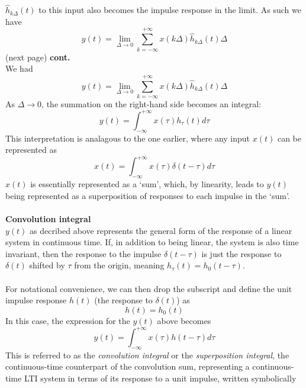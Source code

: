 \documentclass{report}
\begin{document}
$\hat{h}_{k\Delta}(t)$ to this input also becomes the impulse response in the limit. As such we have
\begin{equation*}
y(t)=\lim_{\Delta\to0}\sum^{+\infty}_{k=-\infty}x(k\Delta)
\hat{h}_{k\Delta}(t)\Delta
\end{equation*}
(next page)\newpage
\noindent\textbf{cont.}\\
We had
\begin{equation*}
y(t)=\lim_{\Delta\to0}\sum^{+\infty}_{k=-\infty}x(k\Delta)
\hat{h}_{k\Delta}(t)\Delta
\end{equation*}
As $\Delta\to0$, the summation on the right-hand side becomes an integral:
\begin{equation*}
y(t)=\int^{+\infty}_{-\infty}x(\tau)h_\tau(t)d\tau
\end{equation*}
This interpretation is analagous to the one earlier, where any input $x(t)$ can be represented as 
\begin{equation*}
x(t)=\int^{+\infty}_{-\infty}x(\tau)\delta(t-\tau)d\tau
\end{equation*}
$x(t)$ is essentially represented as a `sum', which, by linearity, leads to $y(t)$ being represented as a superposition of 
responses to each impulse in the `sum'.\\
\vspace{1mm}\\
\textbf{Convolution integral}\\
$y(t)$ as decribed above represents the general form of the response of a linear system in continuous time. 
If, in addition to being linear, the system is also time invariant, then the response to the impulse $\delta(t-\tau)$ is 
just the response to $\delta(t)$ shifted by $\tau$ from the origin, meaning $h_\tau(t)=h_0(t-\tau)$.\\
\vspace{1mm}\\
For notational convenience,
we can then drop the subscript and define the unit impulse response $h(t)$ (the response to $\delta(t)$) as
\begin{equation*}
h(t)=h_0(t)
\end{equation*}
In this case, the expression for the $y(t)$ above becomes
\begin{equation*}
y(t)=\int^{+\infty}_{-\infty}x(\tau)h(t-\tau)d\tau
\end{equation*}
This is referred to as the \textit{convolution integral} or the \textit{superposition integral}, the continuous-time counterpart
of the convolution sum, representing a continuous-time LTI system in terms of its response to a unit impulse, written symbolically
\end{document}
